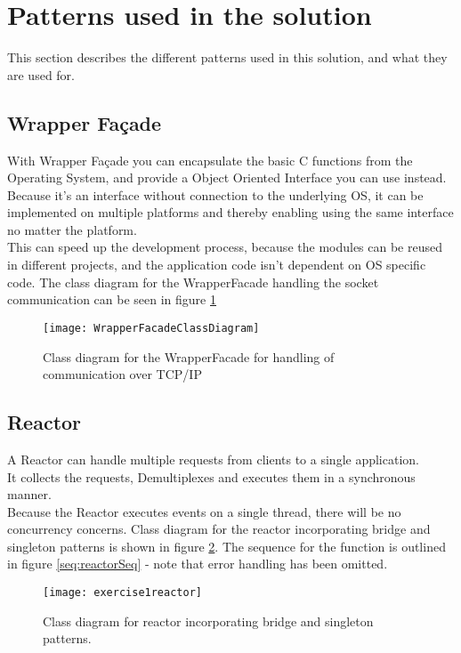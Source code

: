 \documentclass[Main]{subfiles}
\begin{document}
\section{Patterns used in the solution}\label{sec:patterns}
This section describes the different patterns used in this solution, and what they are used for.
\subsection{Wrapper Façade}
With Wrapper Façade you can encapsulate the basic C functions from the Operating System, and provide a Object Oriented Interface you can use instead.\\
Because it's an interface without connection to the underlying OS, it can be implemented on multiple platforms and thereby enabling using the same interface no matter the platform.\\
This can speed up the development process, because the modules can be reused in different projects, and the application code isn't dependent on OS specific code. The class diagram for the WrapperFacade handling the socket communication can be seen in figure \ref{fig:wrapperfacadeuml}

\begin{figure}[hbtp]
\centering
\texttt{[image: WrapperFacadeClassDiagram]}
\caption{Class diagram for the WrapperFacade for handling of communication over TCP/IP}
\label{fig:wrapperfacadeuml}
\end{figure}


\subsection{Reactor}
A Reactor can handle multiple requests from clients to a single application.\\
It collects the requests, Demultiplexes and executes them in a synchronous manner.\\
Because the Reactor executes events on a single thread, there will be no concurrency concerns. Class diagram for the reactor incorporating bridge and singleton patterns is shown in figure \ref{fig:reactoruml}. The sequence for the  function is outlined in figure \ref{seq:reactorSeq} - note that error handling has been omitted.

\begin{figure}[hbtp]
\centering
\texttt{[image: exercise1reactor]}
\caption{Class diagram for reactor incorporating bridge and singleton patterns.}
\label{fig:reactoruml}
\end{figure}
\end{document}
